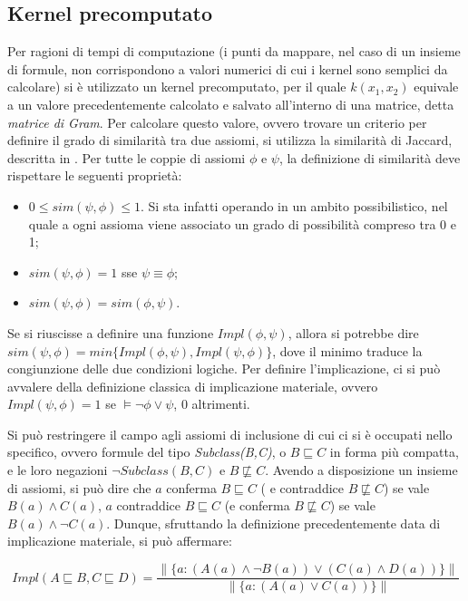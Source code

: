 \documentclass[12pt,a4paper]{report}
\begin{document}
\subsection{Kernel precomputato}
Per ragioni di tempi di computazione (i punti da mappare, nel caso di un insieme di formule, non corrispondono a valori numerici di cui i kernel sono semplici da calcolare) si è utilizzato un kernel precomputato, per il quale  $k(x_1,x_2)$ equivale a un valore precedentemente calcolato e salvato all'interno di una matrice, detta \emph{matrice di Gram}.
Per calcolare questo valore, ovvero trovare un criterio per definire il grado di similarità tra due assiomi, si utilizza la similarità di Jaccard, descritta in \cite{sacpaper}.
Per tutte le coppie di assiomi $\phi$ e $\psi$, la definizione di similarità deve rispettare le seguenti proprietà:
\begin{itemize}
\item $0 \leq sim(\psi, \phi) \leq 1$. Si sta infatti operando in un ambito possibilistico, nel quale a ogni assioma viene associato un grado di possibilità compreso tra 0 e 1;
\item $sim(\psi, \phi) = 1$ sse $\psi \equiv \phi $;
\item $sim(\psi, \phi) = sim(\phi,\psi)$.
\end{itemize}
Se si riuscisse a definire una funzione $Impl(\phi,\psi)$, allora si potrebbe dire $sim(\psi, \phi) = min\{Impl(\phi,\psi), Impl(\psi,\phi)\}$, dove il minimo traduce la congiunzione delle due condizioni logiche.
Per definire l'implicazione, ci si può avvalere della definizione classica di implicazione materiale, ovvero $Impl(\psi,\phi) = 1$ se $\models \lnot \phi \lor \psi$, 0 altrimenti.


Si può restringere il campo agli assiomi di inclusione di cui ci si è occupati nello specifico, ovvero formule del tipo \emph{Subclass(B,C)}, o 	$B \sqsubseteq C$ in forma più compatta, e le loro negazioni \emph{ $\lnot Subclass(B,C)$} e {$ B \not\sqsubseteq C$}.
Avendo a disposizione un insieme di assiomi, si può dire che $a$ conferma $B \sqsubseteq C$ ( e contraddice  {$ B \not\sqsubseteq C$}) se vale $B(a) \land C(a)$, $a$ contraddice  $B \sqsubseteq C$ (e conferma {$ B \not\sqsubseteq C$}) se vale $B(a) \land \lnot C(a)$.
Dunque, sfruttando la definizione precedentemente data di implicazione materiale, si può affermare:

\[Impl(A \sqsubseteq B, C \sqsubseteq D) = \frac{\parallel \{ a: (A(a) \land \lnot B(a)) \lor (C(a) \land D(a)) \} \parallel}{\parallel \{ a: (A(a) \lor C(a))\} \parallel} \]
\end{document}
